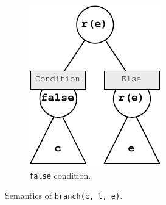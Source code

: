 \begin{figure}
    \hfill
    \begin{subfigure}[b]{0.40\textwidth}
        \centering
        \includegraphics[width=\textwidth]{figures/semantics/branch-false.pdf}
        \caption{\texttt{false} condition.}
        \label{fig:semantics-branch-false}
    \end{subfigure}
    \caption{Semantics of \texttt{branch(c, t, e)}.}
    \label{fig:semantics-branch}
\end{figure}

